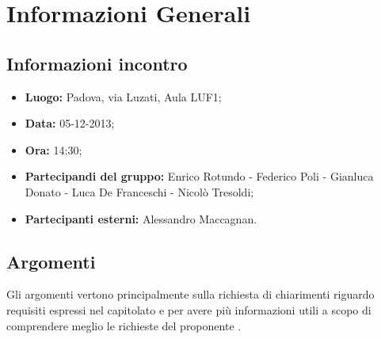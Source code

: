 \section{Informazioni Generali}
	\subsection{Informazioni incontro}
	\begin{itemize}
		\item {\bfseries Luogo:} Padova, via Luzati, Aula LUF1;
		\item {\bfseries Data:} 05-12-2013;
		\item {\bfseries Ora:} 14:30;
		\item {\bfseries Partecipandi del gruppo:} Enrico Rotundo - Federico Poli - Gianluca Donato - Luca De Franceschi - Nicolò Tresoldi;
		\item {\bfseries Partecipanti esterni:} Alessandro Maccagnan.
	\end{itemize}
	
	\subsection{Argomenti}
		Gli argomenti vertono principalmente sulla richiesta di chiarimenti riguardo requisiti espressi nel capitolato e per avere più informazioni utili a scopo di comprendere meglio le richieste del proponente \Proponente.